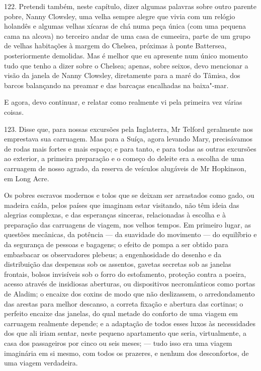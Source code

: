 122. Pretendi também, neste capítulo, dizer algumas palavras sobre outro
parente pobre, Nanny Clowsley, uma velha sempre alegre que vivia com um
relógio holandês e algumas velhas xícaras de chá numa peça única (com
uma pequena cama na alcova) no terceiro andar de uma casa de cumeeira,
parte de um grupo de velhas habitações à margem do Chelsea, próximas à
ponte Battersea, posteriormente demolidas. Mas é melhor que eu apresente
num único momento tudo que tenho a dizer sobre o Chelsea; apenas, sobre
seixos, devo mencionar a visão da janela de Nanny Clowsley, diretamente
para a maré do Tâmisa, dos barcos balançando na preamar e das barcaças
encalhadas na baixa"-mar.

E agora, devo continuar, e relatar como realmente vi pela primeira vez
várias coisas.

123. Disse que, para nossas excursões pela Inglaterra, Mr Telford
geralmente nos emprestava sua carruagem. Mas para a Suíça, agora levando
Mary, precisávamos de rodas mais fortes e mais espaço; e para tanto, e
para todas as outras excursões ao exterior, a primeira preparação e o
começo do deleite era a escolha de uma carruagem de nosso agrado, da
reserva de veículos alugáveis de Mr Hopkinson, em Long Acre.

Os pobres escravos modernos e tolos que se deixam ser arrastados como
gado, ou madeira caída, pelos países que imaginam estar visitando, não
têm ideia das alegrias complexas, e das esperanças sinceras,
relacionadas à escolha e à preparação das carruagens de viagem, nos
velhos tempos. Em primeiro lugar, as questões mecânicas, da potência ---
da suavidade do movimento --- do equilíbrio e da segurança de pessoas e
bagagens; o efeito de pompa a ser obtido para embasbacar os observadores
plebeus; a engenhosidade do desenho e da distribuição das despensas sob
os assentos, gavetas secretas sob as janelas frontais, bolsos invisíveis
sob o forro do estofamento, proteção contra a poeira, acesso através de
insidiosas aberturas, ou dispositivos necromânticos como portas de
Aladim; o encaixe dos coxins de modo que não deslizassem, o
arredondamento das arestas para melhor descanso, a correta fixação e
abertura das cortinas; o perfeito encaixe das janelas, do qual metade do
conforto de uma viagem em carruagem realmente depende; e a adaptação de
todos esses luxos às necessidades dos que ali iriam sentar, neste
pequeno apartamento que seria, virtualmente, a casa dos passageiros por
cinco ou seis meses; --- tudo isso era uma viagem imaginária em si mesmo,
com todos os prazeres, e nenhum dos desconfortos, de uma viagem
verdadeira.

